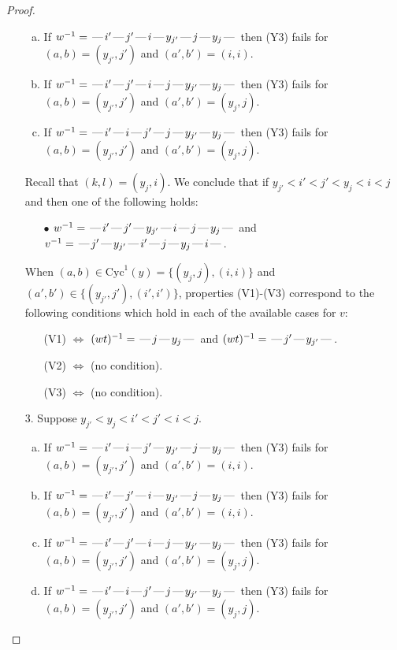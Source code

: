 \documentclass[10pt]{article}
\theoremstyle{definition}
\theoremstyle{definition}
\def\dash{\text{\hspace{0.5mm}---\hspace{0.5mm}}}
\def\Cyc{\mathrm{Cyc}}
\begin{document}
\begin{proof}
\begin{enumerate}
\begin{enumerate}[(a)]
\item If $w^{-1} = \dash i'\dash j'\dash i\dash y_{j'}\dash j\dash y_j\dash $ then (Y3) fails for $(a,b)=(y_{j'},j')$ and $(a',b')=(i,i)$.
\item If $w^{-1} = \dash i'\dash j'\dash i\dash j\dash y_{j'}\dash y_j\dash $ then (Y3) fails for $(a,b)=(y_{j'},j')$ and $(a',b')=(y_j,j)$.
\item If $w^{-1} = \dash i'\dash i\dash j'\dash j\dash y_{j'}\dash y_j\dash $ then (Y3) fails for $(a,b)=(y_{j'},j')$ and $(a',b')=(y_j,j)$.
\end{enumerate}
Recall that $(k,l) = (y_j,i)$.
We conclude that if $y_{j'} < i' < j' < y_j < i < j$ and then one of the following holds:
\begin{enumerate}
\item[$\bullet$] $w^{-1} = \dash i'\dash j'\dash y_{j'}\dash i\dash j\dash y_j\dash $ and $v^{-1} = \dash j'\dash y_{j'}\dash i'\dash j\dash y_j\dash i\dash $.
\end{enumerate}
When $(a,b)\in\Cyc^1(y)=\{(y_j,j),(i,i)\}$ and $(a',b')\in\{(y_{j'},j'),(i',i')\}$,
properties (V1)-(V3) correspond to the following conditions which hold in
each of the available cases for $v$:
\begin{enumerate}
\item[](V1) $\Leftrightarrow$ $(wt)^{-1} = \dash j \dash y_j \dash$  and $(wt)^{-1} = \dash j' \dash y_{j'} \dash$.
\item[](V2) $\Leftrightarrow$ (no condition).
\item[](V3) $\Leftrightarrow$ (no condition).
\end{enumerate}
\item[$3$.] Suppose $y_{j'} < y_j < i' < j' < i < j$.
\begin{enumerate}[(a)]
\item If $w^{-1} = \dash i'\dash i\dash j'\dash y_{j'}\dash j\dash y_j\dash $ then (Y3) fails for $(a,b)=(y_{j'},j')$ and $(a',b')=(i,i)$.
\item If $w^{-1} = \dash i'\dash j'\dash i\dash y_{j'}\dash j\dash y_j\dash $ then (Y3) fails for $(a,b)=(y_{j'},j')$ and $(a',b')=(i,i)$.
\item If $w^{-1} = \dash i'\dash j'\dash i\dash j\dash y_{j'}\dash y_j\dash $ then (Y3) fails for $(a,b)=(y_{j'},j')$ and $(a',b')=(y_j,j)$.
\item If $w^{-1} = \dash i'\dash i\dash j'\dash j\dash y_{j'}\dash y_j\dash $ then (Y3) fails for $(a,b)=(y_{j'},j')$ and $(a',b')=(y_j,j)$.
\end{enumerate}

\end{enumerate}
\end{proof}
\end{document}
